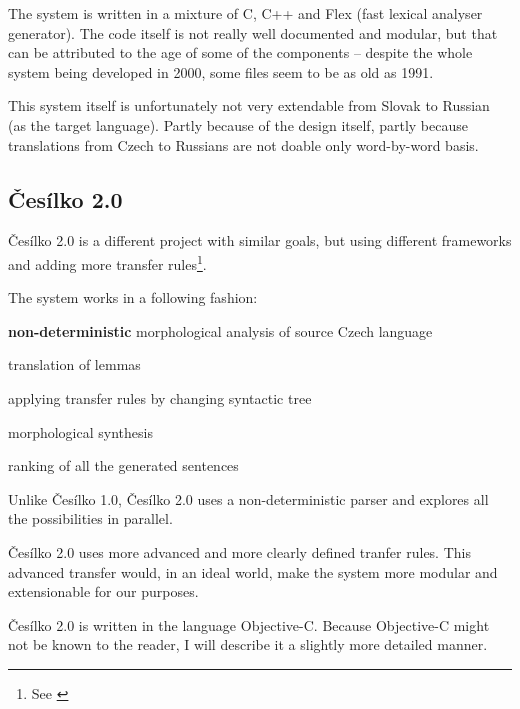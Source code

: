 The system is written in a mixture of C, C++ and Flex (fast lexical analyser generator). The code itself is not really well documented and modular, but that can be attributed to the age of some of the components -- despite the whole system being developed in 2000, some files seem to be as old as 1991.

This system itself is unfortunately not very extendable from Slovak to Russian (as the target language). Partly because of the design itself, partly because translations from Czech to Russians are not doable only word-by-word basis.


\subsection{Česílko 2.0}
Česílko 2.0 is a different project with similar goals, but using different frameworks and adding more transfer rules\footnote{See \cite{cesilko2}}. 

The system works in a following fashion:
\begin{pitemize}
\item \textbf{non-deterministic} morphological analysis of source Czech language
\item translation of lemmas
\item applying transfer rules by changing syntactic tree
\item morphological synthesis
\item ranking of all the generated sentences
\end{pitemize}

Unlike Česílko 1.0, Česílko 2.0 uses a non-deterministic parser and explores all the possi\-bi\-li\-ties in parallel. 

Česílko 2.0 uses more advanced and more clearly defined tranfer rules. This advanced transfer would, in an ideal world, make the system more modular and extensionable for our purposes. 


Česílko 2.0 is written in the language Objective-C. Because Objective-C might not be known to the reader, I will describe it a slightly more detailed manner.

